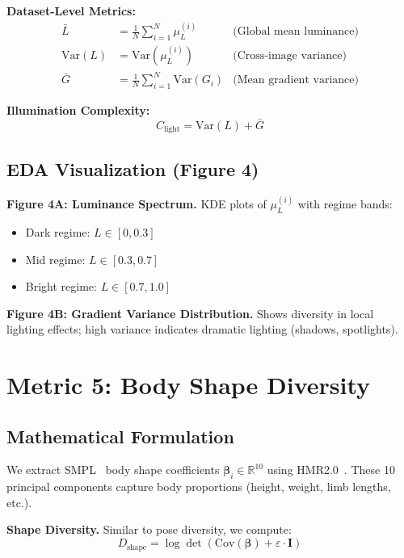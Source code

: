 \documentclass[runningheads]{llncs}
\newcommand{\R}{\mathbb{R}}
\newcommand{\Var}{\mathrm{Var}}
\newcommand{\Cov}{\mathrm{Cov}}
\newcommand{\bvec}[1]{\bm{#1}}
\newcommand{\logdet}{\log\det}
\begin{document}
\textbf{Dataset-Level Metrics:}
\begin{align}
    \bar{L} &= \frac{1}{N}\sum_{i=1}^{N} \mu_L^{(i)} & \text{(Global mean luminance)} \\
    \Var(L) &= \Var(\mu_L^{(i)}) & \text{(Cross-image variance)} \\
    \bar{G} &= \frac{1}{N}\sum_{i=1}^{N} \Var(G_i) & \text{(Mean gradient variance)}
\end{align}

\textbf{Illumination Complexity:}
\begin{equation}
    C_{\text{light}} = \Var(L) + \bar{G}
\end{equation}

\subsection{EDA Visualization (Figure 4)}

\textbf{Figure 4A: Luminance Spectrum.} KDE plots of $\mu_L^{(i)}$ with regime bands:
\begin{itemize}
    \item Dark regime: $L \in [0, 0.3]$
    \item Mid regime: $L \in [0.3, 0.7]$
    \item Bright regime: $L \in [0.7, 1.0]$
\end{itemize}

\textbf{Figure 4B: Gradient Variance Distribution.} Shows diversity in local lighting effects; high variance indicates dramatic lighting (shadows, spotlights).


\section{Metric 5: Body Shape Diversity}
\label{sec:m5_bodyshape}

\subsection{Mathematical Formulation}

We extract SMPL~\cite{loper2015smpl} body shape coefficients $\bvec{\beta}_i \in \R^{10}$ using HMR2.0~\cite{goel20234dhumans}. These 10 principal components capture body proportions (height, weight, limb lengths, etc.).

\textbf{Shape Diversity.} Similar to pose diversity, we compute:
\begin{equation}
    D_{\text{shape}} = \logdet\left(\Cov(\bvec{\beta}) + \varepsilon \cdot \bvec{I}\right)
\end{equation}
\end{document}
